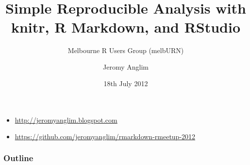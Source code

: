 \documentclass[t]{beamer}
\title{Simple Reproducible Analysis with knitr, R Markdown, and RStudio}
\subtitle{Melbourne R Users Group (melbURN)}
\author{Jeromy Anglim}
\institute{Melbourne Business School}
\date{18th July 2012}
\begin{document}
\begin{frame}
\titlepage
\begin{itemize}
\item 	\url{http://jeromyanglim.blogspot.com}
\item     \url{https://github.com/jeromyanglim/rmarkdown-rmeetup-2012}
\end{itemize}
\end{frame}

\begin{frame}
\frametitle{Outline}
\tableofcontents
\end{frame}


\end{document}
